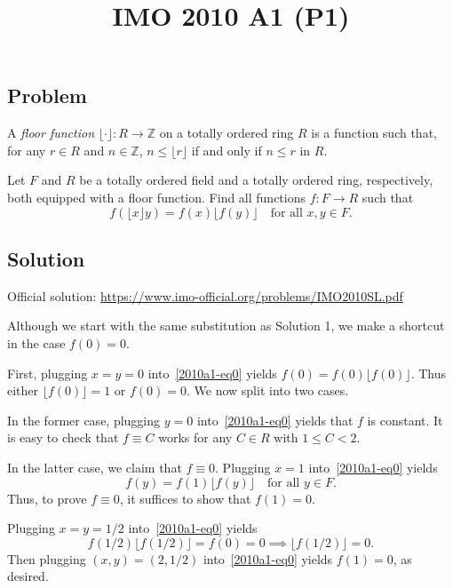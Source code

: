 \documentclass{article}
\title{IMO 2010 A1 (P1)}
\author{}
\date{}
\newcommand{\Z}{\mathbb{Z}}
\begin{document}
\maketitle



\subsection*{Problem}

A \emph{floor function} $\lfloor \cdot \rfloor : R \to \Z$ on a totally ordered ring $R$ is a function such that, for any $r \in R$ and $n \in \Z$, $n \leq \lfloor r \rfloor$ if and only if $n \leq r$ in $R$.

Let $F$ and $R$ be a totally ordered field and a totally ordered ring, respectively, both equipped with a floor function.
Find all functions $f : F \to R$ such that
\[ f(\lfloor x \rfloor y) = f(x) \lfloor f(y) \rfloor \quad \text{for all } x, y \in F. \tag{*}\label{2010a1-eq0} \]



\subsection*{Solution}

Official solution: \url{https://www.imo-official.org/problems/IMO2010SL.pdf}

Although we start with the same substitution as Solution 1, we make a shortcut in the case $f(0) = 0$.

First, plugging $x = y = 0$ into~\eqref{2010a1-eq0} yields $f(0) = f(0) \lfloor f(0) \rfloor$.
Thus either $\lfloor f(0) \rfloor = 1$ or $f(0) = 0$.
We now split into two cases.

In the former case, plugging $y = 0$ into~\eqref{2010a1-eq0} yields that $f$ is constant.
It is easy to check that $f \equiv C$ works for any $C \in R$ with $1 \leq C < 2$.

In the latter case, we claim that $f \equiv 0$.
Plugging $x = 1$ into~\eqref{2010a1-eq0} yields
\[ f(y) = f(1) \lfloor f(y) \rfloor \quad \text{for all } y \in F. \]
Thus, to prove $f \equiv 0$, it suffices to show that $f(1) = 0$.

Plugging $x = y = 1/2$ into~\eqref{2010a1-eq0} yields
\[ f(1/2) \lfloor f(1/2) \rfloor = f(0) = 0 \implies \lfloor f(1/2) \rfloor = 0. \]
Then plugging $(x, y) = (2, 1/2)$ into~\eqref{2010a1-eq0} yields $f(1) = 0$, as desired.
\end{document}
